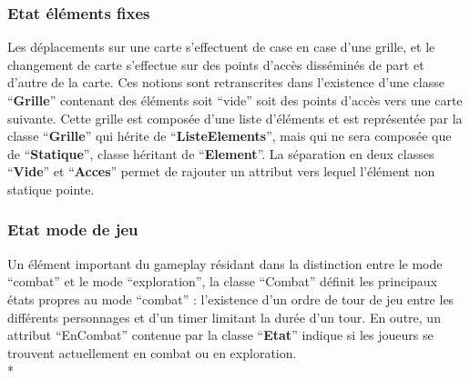 \documentclass[11pt, a4paper]{article}
\begin{document}
\subsubsection{Etat éléments fixes}

Les déplacements sur une carte s’effectuent de case en case d’une grille, et le changement de carte s’effectue sur des points d’accès disséminés de part et d’autre de la carte. Ces notions sont retranscrites dans l’existence d’une classe “\textbf{Grille}” contenant des éléments soit “vide” soit des points d’accès vers une carte suivante. Cette grille est composée d’une liste d’éléments et est représentée par la classe “\textbf{Grille}” qui hérite de “\textbf{ListeElements}”, mais qui ne sera composée que de “\textbf{Statique}”, classe héritant de “\textbf{Element}”. La séparation en deux classes “\textbf{Vide}” et “\textbf{Acces}” permet de rajouter un attribut vers lequel l’élément non statique pointe.

\subsubsection{Etat mode de jeu}

	Un élément important du gameplay résidant dans la distinction entre le mode “combat” et le mode “exploration”, la classe “Combat” définit les principaux états propres au mode “combat” : l’existence d’un ordre de tour de jeu entre les différents personnages et d’un timer limitant la durée d’un tour. En outre, un attribut “EnCombat” contenue par la classe “\textbf{Etat}” indique si les joueurs se trouvent actuellement en combat ou en exploration. \\*\\
\end{document}
